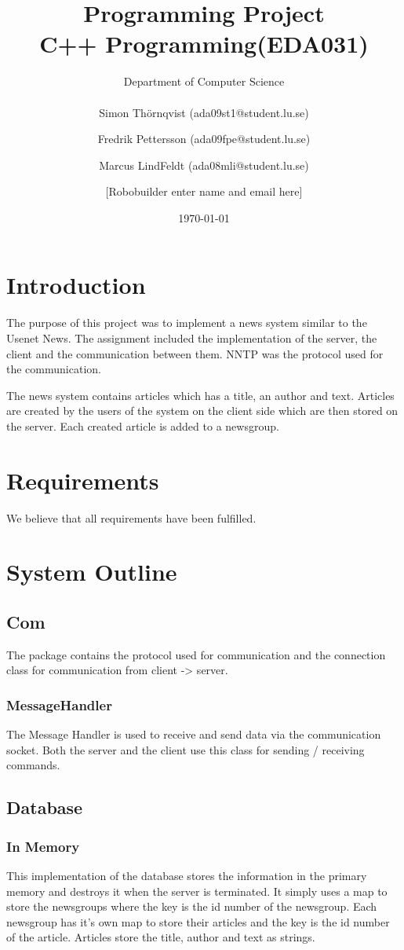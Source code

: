 \documentclass[a4paper, titlepage]{article}
\title{
    Programming Project \\
    C++ Programming(EDA031)
}
\author{
        Department of Computer Science \\
            \\
        Simon Thörnqvist (ada09st1@student.lu.se)
            \and
        Fredrik Pettersson (ada09fpe@student.lu.se)
            \and
        Marcus LindFeldt (ada08mli@student.lu.se)
            \and
        [Robobuilder enter name and email here]
}
\date{\today}
\begin{document}
\maketitle

\section{Introduction}\label{introduction}
The purpose of this project was to implement a news system similar to the Usenet News. The assignment included the implementation of the server, the client and the communication between them. NNTP was the protocol used for the communication.

The news system contains articles which has a title, an author and text. Articles are created by the users of the system on the client side which are then stored on the server. Each created article is added to a newsgroup.

\section{Requirements}\label{requirements}
We believe that all requirements have been fulfilled.

\section{System Outline}\label{systemoutline}
\subsection{Com}
The package contains the protocol used for communication and the connection class for communication from client -> server.
\subsubsection{MessageHandler}
The Message Handler is used to receive and send data via the communication socket. Both the server and the client use this class for sending / receiving commands.
\subsection{Database}
\subsubsection{In Memory}
This implementation of the database stores the information in the primary memory and destroys it when the server is terminated. It simply uses a map to store the newsgroups where the key is the id number of the newsgroup. Each newsgroup has it's own map to store their articles and the key is the id number of the article. Articles store the title, author and text as strings.
\end{document}
